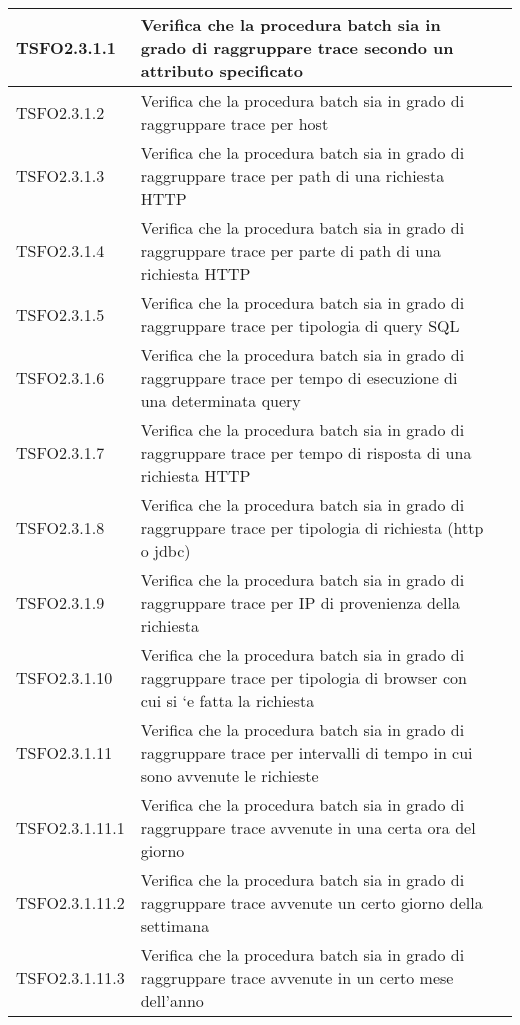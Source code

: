 \begin{center}
\begin{longtable}{ | >{\centering\arraybackslash}m{2.5cm} | >{\raggedright\arraybackslash}m{9cm} | >{\centering\arraybackslash}m{3.5cm} | }
				TSFO2.3.1.1 & Verifica che la procedura batch sia in grado di raggruppare trace secondo un attributo specificato & \donetext{} \\ \hline
				TSFO2.3.1.2 & Verifica che la procedura batch sia in grado di raggruppare trace per host & \donetext{} \\ \hline
				TSFO2.3.1.3 & Verifica che la procedura batch sia in grado di raggruppare trace per path di una richiesta HTTP
 & \donetext{} \\ \hline
				TSFO2.3.1.4 & Verifica che la procedura batch sia in grado di raggruppare trace per parte di path di una richiesta HTTP
 & \donetext{} \\ \hline
				TSFO2.3.1.5 & Verifica che la procedura batch sia in grado di raggruppare trace per tipologia di query SQL
 & \donetext{} \\ \hline
				TSFO2.3.1.6 & Verifica che la procedura batch sia in grado di raggruppare trace per  tempo di esecuzione di una determinata query
 & \donetext{} \\ \hline
				TSFO2.3.1.7 & Verifica che la procedura batch sia in grado di raggruppare trace per tempo di risposta di una richiesta HTTP
 & \donetext{} \\ \hline
				TSFO2.3.1.8 & Verifica che la procedura batch sia in grado di raggruppare trace per tipologia di richiesta (http o jdbc)
 & \donetext{} \\ \hline
				TSFO2.3.1.9 & Verifica che la procedura batch sia in grado di raggruppare trace per IP di provenienza della richiesta
 & \donetext{} \\ \hline
				TSFO2.3.1.10 & Verifica che la procedura batch sia in grado di raggruppare trace per tipologia di browser con cui si `e fatta la richiesta
 & \donetext{} \\ \hline
				TSFO2.3.1.11 & Verifica che la procedura batch sia in grado di raggruppare trace per intervalli di tempo in cui sono avvenute le richieste
 & \donetext{} \\ \hline
				TSFO2.3.1.11.1 & Verifica che la procedura batch sia in grado di raggruppare trace avvenute in una certa ora del giorno
 & \donetext{} \\ \hline
				TSFO2.3.1.11.2 & Verifica che la procedura batch sia in grado di raggruppare trace avvenute un certo giorno della settimana
 & \donetext{} \\ \hline
				TSFO2.3.1.11.3 & Verifica che la procedura batch sia in grado di raggruppare trace avvenute in un certo mese dell’anno
 & \donetext{} \\ \hline
				

\end{longtable}
\end{center}
